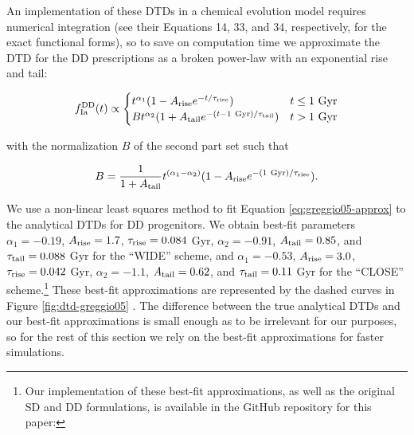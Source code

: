 \documentclass[twocolumn,linenumbers,twocolappendix]{aastex631}
\begin{document}
An implementation of these DTDs in a chemical evolution model requires numerical integration (see their Equations 14, 33, and 34, respectively, for the exact functional forms), so to save on computation time we approximate the DTD for the DD prescriptions as a broken power-law with an exponential rise and tail:

\begin{equation}
    f_{\rm{Ia}}^{\rm{DD}}(t) \propto
    \begin{cases}
        t^{\alpha_1} (1 - A_{\rm{rise}} e^{-t/\tau_{\rm{rise}}}) & t \le 1~\rm{Gyr} \\
        B t^{\alpha_2} (1 + A_{\rm{tail}} e^{-(t - 1~\rm{Gyr})/\tau_{\rm{tail}}}) & t > 1~\rm{Gyr}
    \end{cases}
    \label{eq:greggio05-approx}
\end{equation}

\noindent with the normalization $B$ of the second part set such that

\begin{equation}
    B = \frac{1}{1 + A_{\rm{tail}}} t^{(\alpha_1-\alpha_2)} (1 - A_{\rm{rise}} e^{-(1~\rm{Gyr})/\tau_{\rm{rise}}}).
\end{equation}

\noindent We use a non-linear least squares method to fit Equation \ref{eq:greggio05-approx} to the analytical DTDs for DD progenitors. We obtain best-fit parameters $\alpha_1=-0.19$, $A_{\rm{rise}}=1.7$, $\tau_{\rm{rise}}=0.084$ Gyr, $\alpha_2=-0.91$, $A_{\rm{tail}}=0.85$, and $\tau_{\rm{tail}}=0.088$ Gyr for the ``WIDE'' scheme, and $\alpha_1=-0.53$, $A_{\rm{rise}}=3.0$, $\tau_{\rm{rise}}=0.042$ Gyr, $\alpha_2=-1.1$, $A_{\rm{tail}}=0.62$, and $\tau_{\rm{tail}}=0.11$ Gyr for the ``CLOSE'' scheme.\footnote{
Our implementation of these best-fit approximations, as well as the original SD and DD formulations, is available in the GitHub repository for this paper: \GitHubURL
} These best-fit approximations are represented by the dashed curves in Figure \ref{fig:dtd-greggio05} \citep[see also Figure 8 in][]{Greggio2005-AnalyticalRates}. The difference between the true analytical DTDs and our best-fit approximations is small enough as to be irrelevant for our purposes, so for the rest of this section we rely on the best-fit approximations for faster simulations.

\end{document}
